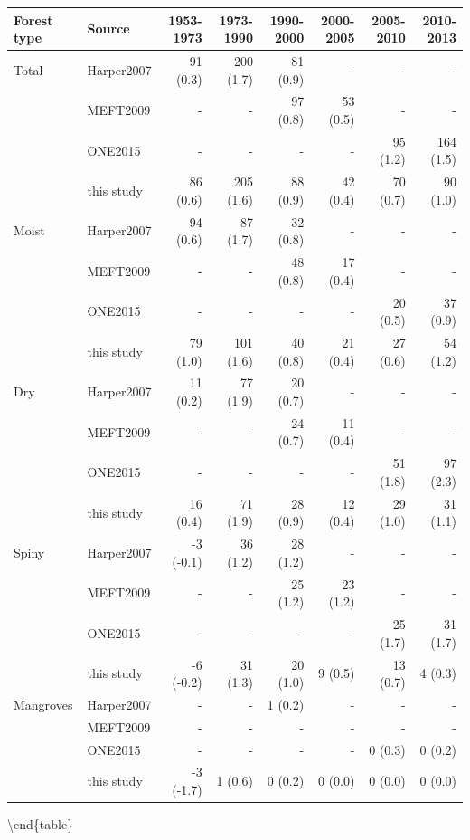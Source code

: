 \documentclass[]{article}
\theoremstyle{definition}
\theoremstyle{definition}
\theoremstyle{definition}
\theoremstyle{remark}
\begin{document}
\begin{tabular}[t]{llrrrrrr}
\toprule
Forest type & Source & 1953-1973 & 1973-1990 & 1990-2000 & 2000-2005 & 2005-2010 & 2010-2013\\
\midrule
Total & Harper2007 & 91 (0.3) & 200 (1.7) & 81 (0.9) & - & - & -\\
 & MEFT2009 & - & - & 97 (0.8) & 53 (0.5) & - & -\\
 & ONE2015 & - & - & - & - & 95 (1.2) & 164 (1.5)\\
 & this study & 86 (0.6) & 205 (1.6) & 88 (0.9) & 42 (0.4) & 70 (0.7) & 90 (1.0)\\
Moist & Harper2007 & 94 (0.6) & 87 (1.7) & 32 (0.8) & - & - & -\\
\addlinespace
 & MEFT2009 & - & - & 48 (0.8) & 17 (0.4) & - & -\\
 & ONE2015 & - & - & - & - & 20 (0.5) & 37 (0.9)\\
 & this study & 79 (1.0) & 101 (1.6) & 40 (0.8) & 21 (0.4) & 27 (0.6) & 54 (1.2)\\
Dry & Harper2007 & 11 (0.2) & 77 (1.9) & 20 (0.7) & - & - & -\\
 & MEFT2009 & - & - & 24 (0.7) & 11 (0.4) & - & -\\
\addlinespace
 & ONE2015 & - & - & - & - & 51 (1.8) & 97 (2.3)\\
 & this study & 16 (0.4) & 71 (1.9) & 28 (0.9) & 12 (0.4) & 29 (1.0) & 31 (1.1)\\
Spiny & Harper2007 & -3 (-0.1) & 36 (1.2) & 28 (1.2) & - & - & -\\
 & MEFT2009 & - & - & 25 (1.2) & 23 (1.2) & - & -\\
 & ONE2015 & - & - & - & - & 25 (1.7) & 31 (1.7)\\
\addlinespace
 & this study & -6 (-0.2) & 31 (1.3) & 20 (1.0) & 9 (0.5) & 13 (0.7) & 4 (0.3)\\
Mangroves & Harper2007 & - & - & 1 (0.2) & - & - & -\\
 & MEFT2009 & - & - & - & - & - & -\\
 & ONE2015 & - & - & - & - & 0 (0.3) & 0 (0.2)\\
 & this study & -3 (-1.7) & 1 (0.6) & 0 (0.2) & 0 (0.0) & 0 (0.0) & 0 (0.0)\\
\bottomrule
\end{tabular}

\textbackslash{}end\{table\}
\end{document}
